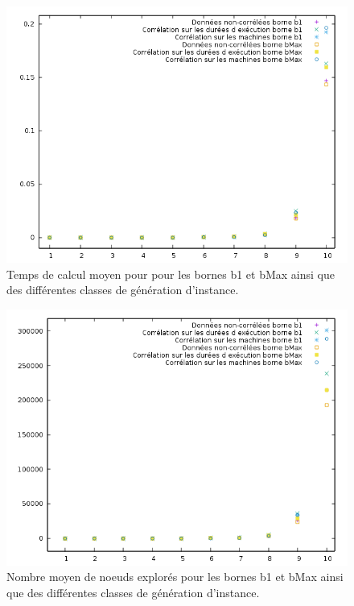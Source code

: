 \documentclass[12pt]{article}
\begin{document}
\begin{figure}[!ht]
\centering
\centerline{\includegraphics[scale=0.9]{tempsmoyen.png}}
\caption{Temps de calcul moyen pour pour les bornes b1 et bMax ainsi que des différentes classes de génération d'instance.}
\label{tmpmoy}
\end{figure}

\begin{figure}[!ht]
\centering
\centerline{\includegraphics[scale=0.9]{nodemoyen.png}}
\caption{Nombre moyen de noeuds explorés pour les bornes b1 et bMax ainsi que des différentes classes de génération d'instance.}
\label{ndmoy}
\end{figure}
\end{document}
